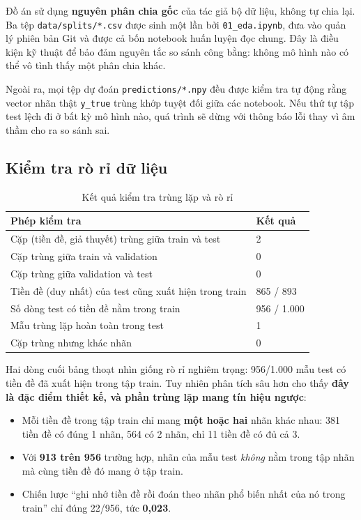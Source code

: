 \documentclass[12pt,a4paper,oneside]{report}
\begin{document}
Đồ án sử dụng \textbf{nguyên phân chia gốc} của tác giả bộ dữ liệu, không tự chia lại. Ba
tệp \texttt{data/splits/*.csv} được sinh một lần bởi \texttt{01\_eda.ipynb}, đưa vào quản
lý phiên bản Git và được cả bốn notebook huấn luyện đọc chung. Đây là điều kiện kỹ thuật
để bảo đảm nguyên tắc so sánh công bằng: không mô hình nào có thể vô tình thấy một phân
chia khác.

Ngoài ra, mọi tệp dự đoán \texttt{predictions/*.npy} đều được kiểm tra tự động rằng vector
nhãn thật \texttt{y\_true} trùng khớp tuyệt đối giữa các notebook. Nếu thứ tự tập test lệch
đi ở bất kỳ mô hình nào, quá trình sẽ dừng với thông báo lỗi thay vì âm thầm cho ra so
sánh sai.

\subsection{Kiểm tra rò rỉ dữ liệu}

\begin{table}[H]
\centering
\caption{Kết quả kiểm tra trùng lặp và rò rỉ}
\begin{tabularx}{\textwidth}{@{}Y C{3.0cm}@{}}
\toprule
\textbf{Phép kiểm tra} & \textbf{Kết quả} \\
\midrule
Cặp (tiền đề, giả thuyết) trùng giữa train và test & 2 \\
Cặp trùng giữa train và validation                 & 0 \\
Cặp trùng giữa validation và test                  & 0 \\
Tiền đề (duy nhất) của test cũng xuất hiện trong train & 865 / 893 \\
Số dòng test có tiền đề nằm trong train            & 956 / 1.000 \\
Mẫu trùng lặp hoàn toàn trong test                 & 1 \\
Cặp trùng nhưng khác nhãn                          & 0 \\
\bottomrule
\end{tabularx}
\end{table}

Hai dòng cuối bảng thoạt nhìn giống rò rỉ nghiêm trọng: 956/1.000 mẫu test có tiền đề đã
xuất hiện trong tập train. Tuy nhiên phân tích sâu hơn cho thấy \textbf{đây là đặc điểm
thiết kế, và phần trùng lặp mang tín hiệu ngược}:

\begin{itemize}[leftmargin=*,itemsep=3pt]
  \item Mỗi tiền đề trong tập train chỉ mang \textbf{một hoặc hai} nhãn khác nhau: 381
        tiền đề có đúng 1 nhãn, 564 có 2 nhãn, chỉ 11 tiền đề có đủ cả 3.
  \item Với \textbf{913 trên 956} trường hợp, nhãn của mẫu test \textit{không} nằm trong
        tập nhãn mà cùng tiền đề đó mang ở tập train.
  \item Chiến lược ``ghi nhớ tiền đề rồi đoán theo nhãn phổ biến nhất của nó trong train''
        chỉ đúng 22/956, tức \textbf{0,023}.
\end{itemize}
\end{document}
